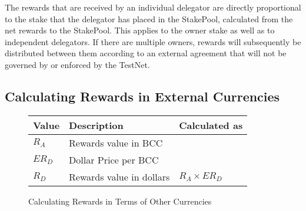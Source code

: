 \documentclass[11pt,a4paper,dvipsnames,twosided,final]{article}
\newcommand{\bcc}{BCC{}}
\newcommand{\bcc}[1]{Bcc}
\begin{document}
\noindent
The rewards that are received by an individual delegator are directly proportional to the
stake that the delegator has placed in the StakePool, calculated from the net rewards to the
StakePool.  This applies to the owner stake as well as to independent delegators.
If there are multiple owners, rewards will subsequently be distributed between them according to an external
agreement that will not be governed by or enforced by the TestNet.




\subsection{Calculating Rewards in External Currencies}
\label{sec:conversion}

\begin{figure}[h!]
\begin{center}
\begin{tabular}{||l|p{6cm}|l||}
  \hline \hline
\textbf{Value} & \textbf{Description} & \textbf{Calculated as} \\\hline
$R_A$ &  Rewards value in \bcc{} &\\\hline
$ER_D$ &  Dollar Price per \bcc{} &\\\hline
$R_D$ &  Rewards value in dollars & $R_A \times ER_D$ \\\hline
\hline
\end{tabular}
\end{center}
\caption{Calculating Rewards in Terms of Other Currencies}
\label{fig:monetary}
\end{figure}
\end{document}
